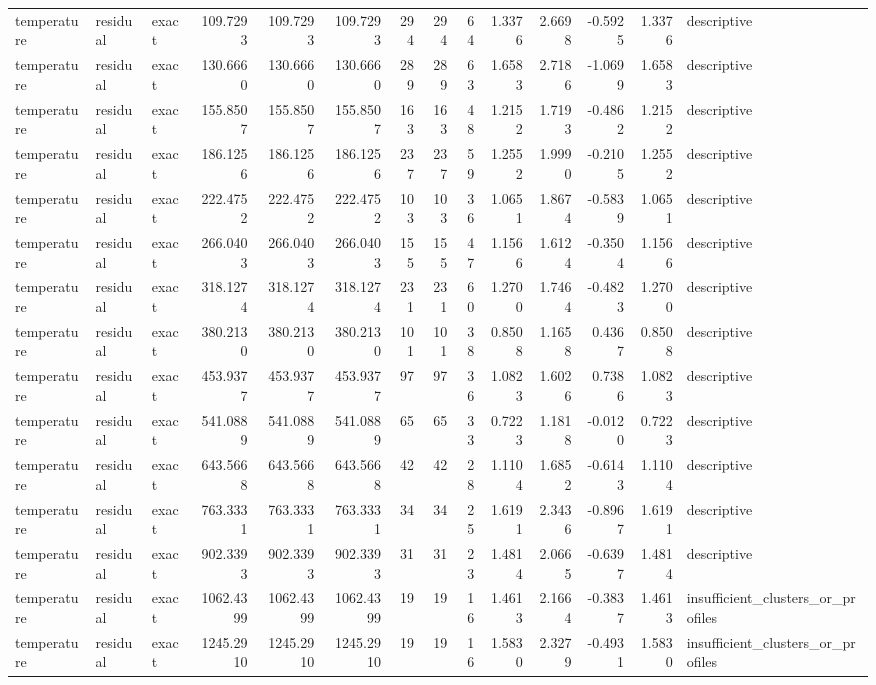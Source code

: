 \begin{tabular}{lllrrrrrrrrrrl}
temperature & residual & exact & 109.7293 & 109.7293 & 109.7293 & 294 & 294 & 64 & 1.3376 & 2.6698 & -0.5925 & 1.3376 & descriptive \\
temperature & residual & exact & 130.6660 & 130.6660 & 130.6660 & 289 & 289 & 63 & 1.6583 & 2.7186 & -1.0699 & 1.6583 & descriptive \\
temperature & residual & exact & 155.8507 & 155.8507 & 155.8507 & 163 & 163 & 48 & 1.2152 & 1.7193 & -0.4862 & 1.2152 & descriptive \\
temperature & residual & exact & 186.1256 & 186.1256 & 186.1256 & 237 & 237 & 59 & 1.2552 & 1.9990 & -0.2105 & 1.2552 & descriptive \\
temperature & residual & exact & 222.4752 & 222.4752 & 222.4752 & 103 & 103 & 36 & 1.0651 & 1.8674 & -0.5839 & 1.0651 & descriptive \\
temperature & residual & exact & 266.0403 & 266.0403 & 266.0403 & 155 & 155 & 47 & 1.1566 & 1.6124 & -0.3504 & 1.1566 & descriptive \\
temperature & residual & exact & 318.1274 & 318.1274 & 318.1274 & 231 & 231 & 60 & 1.2700 & 1.7464 & -0.4823 & 1.2700 & descriptive \\
temperature & residual & exact & 380.2130 & 380.2130 & 380.2130 & 101 & 101 & 38 & 0.8508 & 1.1658 & 0.4367 & 0.8508 & descriptive \\
temperature & residual & exact & 453.9377 & 453.9377 & 453.9377 & 97 & 97 & 36 & 1.0823 & 1.6026 & 0.7386 & 1.0823 & descriptive \\
temperature & residual & exact & 541.0889 & 541.0889 & 541.0889 & 65 & 65 & 33 & 0.7223 & 1.1818 & -0.0120 & 0.7223 & descriptive \\
temperature & residual & exact & 643.5668 & 643.5668 & 643.5668 & 42 & 42 & 28 & 1.1104 & 1.6852 & -0.6143 & 1.1104 & descriptive \\
temperature & residual & exact & 763.3331 & 763.3331 & 763.3331 & 34 & 34 & 25 & 1.6191 & 2.3436 & -0.8967 & 1.6191 & descriptive \\
temperature & residual & exact & 902.3393 & 902.3393 & 902.3393 & 31 & 31 & 23 & 1.4814 & 2.0665 & -0.6397 & 1.4814 & descriptive \\
temperature & residual & exact & 1062.4399 & 1062.4399 & 1062.4399 & 19 & 19 & 16 & 1.4613 & 2.1664 & -0.3837 & 1.4613 & insufficient_clusters_or_profiles \\
temperature & residual & exact & 1245.2910 & 1245.2910 & 1245.2910 & 19 & 19 & 16 & 1.5830 & 2.3279 & -0.4931 & 1.5830 & insufficient_clusters_or_profiles \\

\end{tabular}
